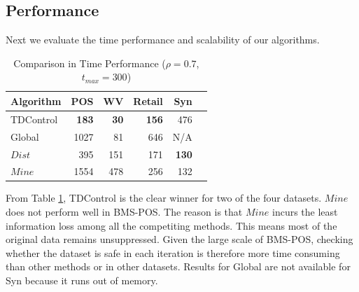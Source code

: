 \subsection{Performance}\label{sec:eval:performance}
Next we evaluate the time performance and scalability of
our algorithms.

\begin{table}[bh]
\caption{Comparison in Time Performance ($\rho=0.7$, $t_{max}=300$)}
\centering
\begin{tabular}{|l|r|r|r|r|r|}
  \hline
  Algorithm & POS & WV & Retail  &Syn \\  \hline \hline
  TDControl & \bf{183} & \bf{30 }& \bf{156} &   476  \\  \hline
  Global & 1027 & 81 & 646 &   N/A  \\  \hline
  $Dist$ & 395 & 151 & 171 &\bf{130}\\ \hline
  $Mine$ & 1554 & 478& 256 & 132\\ \hline
  \end{tabular}
\label{tab:timeresult}
\end{table}

From Table \ref{tab:timeresult}, TDControl is the clear winner
for two of the four datasets. $Mine$ does not perform well in BMS-POS.
The reason is that $Mine$ incurs the least information loss among all the
competiting methods. This means most of the original data remains
unsuppressed. Given the large scale of BMS-POS, checking whether the
dataset is safe in each iteration is therefore more time consuming than
other methods or in other datasets.
Results for Global are not available for Syn because
it runs out of memory.

